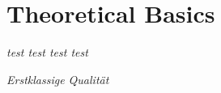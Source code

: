 \chapter{Theoretical Basics}
\label{ch:basics}

\cite{tikhanovskayaUniversalityCrossEntropy2023}

\emph{test test test test}

\emph{Erstklassige Qualit\"at}
